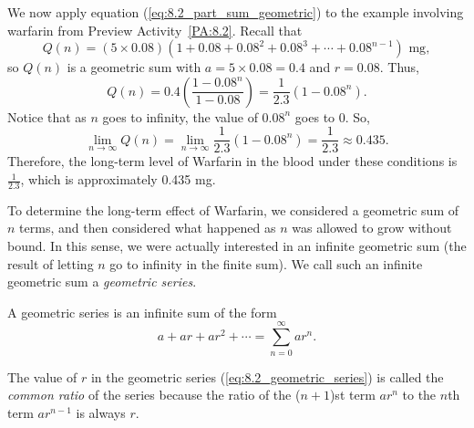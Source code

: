 \vspace*{5pt}
\nin {}
\vspace*{1pt}

We now apply equation (\ref{eq:8.2_part_sum_geometric}) to the example involving warfarin from Preview Activity~\ref{PA:8.2}. Recall that
\[Q(n)=(5 \times 0.08)\left(1+0.08+0.08^2+0.08^3+ \cdots + 0.08^{n-1}\right) \text{ mg},\]
so $Q(n)$ is a geometric sum with $a=5 \times 0.08 = 0.4$ and $r = 0.08$. Thus,
\[Q(n) = 0.4\left(\frac{1-0.08^n}{1-0.08}\right) = \frac{1}{2.3} \left(1-0.08^n\right).\]
Notice that as $n$ goes to infinity, the value of $0.08^n$ goes to 0. So,
\[\lim_{n \to \infty} Q(n) = \lim_{n \to \infty}  \frac{1}{2.3} \left(1-0.08^n\right) = \frac{1}{2.3} \approx 0.435.\]
Therefore, the long-term level of Warfarin in the blood under these conditions is $\frac{1}{2.3}$, which is approximately 0.435 mg.

To determine the long-term effect of Warfarin, we considered a geometric sum of $n$ terms, and then considered what happened as $n$ was allowed to grow without bound.  In this sense, we were actually interested in an infinite geometric sum (the result of letting $n$ go to infinity in the finite sum).  We call such an infinite geometric sum a \emph{geometric series}.  

\begin{definition}  A geometric series is an infinite sum of the form
\begin{equation} \label{eq:8.2_geometric_series}
a + ar + ar^2 + \cdots = \sum_{n=0}^{\infty} ar^n.
\end{equation}
\end{definition}
The value of $r$ in the geometric series (\ref{eq:8.2_geometric_series}) is called the \emph{common ratio}  of the series because the ratio of the ($n+1$)st term $ar^n$ to the $n$th term $ar^{n-1}$ is always $r$.

